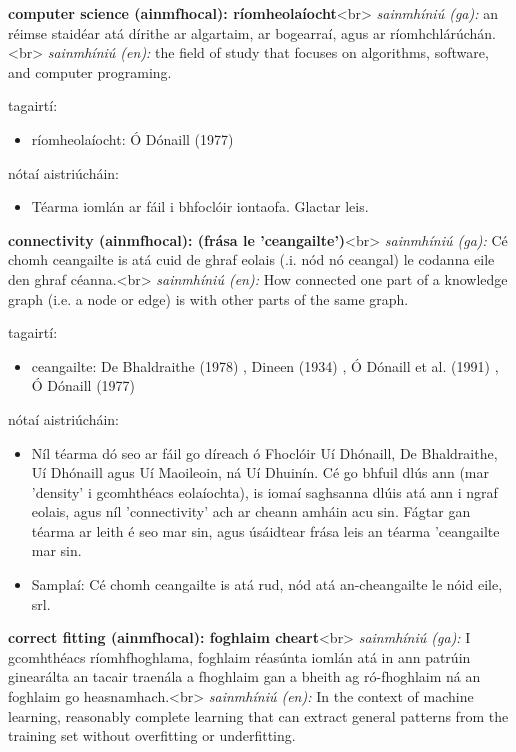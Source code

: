 \documentclass{article}
\begin{document}
\textbf{computer science (ainmfhocal): ríomheolaíocht}<br>
\textit{sainmhíniú (ga):} an réimse staidéar atá dírithe ar algartaim, ar bogearraí, agus ar ríomhchlárúchán.<br>
\textit{sainmhíniú (en):} the field of study that focuses on algorithms, software, and computer programing.

tagairtí:
\begin{itemize}
	\item ríomheolaíocht: Ó Dónaill (1977) \cite{odonaill}
\end{itemize}

nótaí aistriúcháin:
\begin{itemize}
	\item Téarma iomlán ar fáil i bhfoclóir iontaofa. Glactar leis.
\end{itemize}


\textbf{connectivity (ainmfhocal): (frása le 'ceangailte')}<br>
\textit{sainmhíniú (ga):} Cé chomh ceangailte is atá cuid de ghraf eolais (.i. nód nó ceangal) le codanna eile den ghraf céanna.<br>
\textit{sainmhíniú (en):} How connected one part of a knowledge graph (i.e. a node or edge) is with other parts of the same graph.

tagairtí:
\begin{itemize}
	\item ceangailte: De Bhaldraithe (1978) \cite{de-bhaldraithe}, Dineen (1934) \cite{dineen}, Ó Dónaill et al. (1991) \cite{focloir-beag}, Ó Dónaill (1977) \cite{odonaill}
\end{itemize}

nótaí aistriúcháin:
\begin{itemize}
	\item Níl téarma dó seo ar fáil go díreach ó Fhoclóir Uí Dhónaill, De Bhaldraithe, Uí Dhónaill agus Uí Maoileoin, ná Uí Dhuinín. Cé go bhfuil dlús ann (mar 'density' i gcomhthéacs eolaíochta), is iomaí saghsanna dlúis atá ann i ngraf eolais, agus níl 'connectivity' ach ar cheann amháin acu sin. Fágtar gan téarma ar leith é seo mar sin, agus úsáidtear frása leis an téarma 'ceangailte mar sin.
	\item Samplaí: Cé chomh ceangailte is atá rud, nód atá an-cheangailte le nóid eile, srl.
\end{itemize}


\textbf{correct fitting (ainmfhocal): foghlaim cheart}<br>
\textit{sainmhíniú (ga):} I gcomhthéacs ríomhfhoghlama, foghlaim réasúnta iomlán atá in ann patrúin ginearálta an tacair traenála a fhoghlaim gan a bheith ag ró-fhoghlaim ná an foghlaim go heasnamhach.<br>
\textit{sainmhíniú (en):} In the context of machine learning, reasonably complete learning that can extract general patterns from the training set without overfitting or underfitting.
\end{document}
